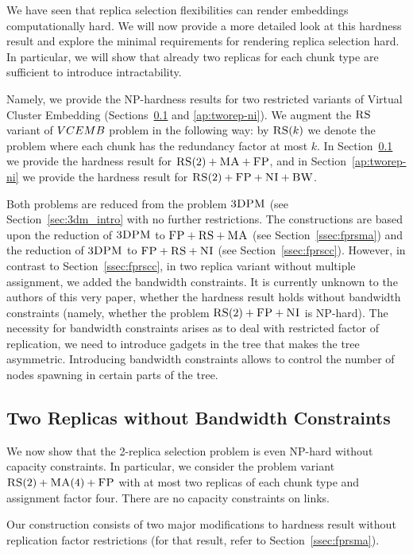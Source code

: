 We have seen that replica selection flexibilities can render embeddings computationally hard.
We will now provide a more detailed look at this hardness result
and explore the minimal requirements for rendering replica selection hard.
In particular, we will show that already two replicas for each chunk type are sufficient to
introduce intractability.

Namely, we provide the NP-hardness results for two restricted variants of Virtual Cluster Embedding (Sections~\ref{ap:tworep-ma} and \ref{ap:tworep-ni}).
We augment the $\textsc{RS}$ variant of $VCEMB$ problem in the following way: by $\textsc{RS}(k)$ we denote the problem where each chunk has the redundancy factor at most $k$.
In Section~\ref{ap:tworep-ma} we provide the hardness result for $\textsc{RS}(2)+\textsc{MA}+\textsc{FP}$, and in Section~\ref{ap:tworep-ni} we provide the hardness result for $\textsc{RS}(2)+\textsc{FP}+\textsc{NI}+\textsc{BW}$.

Both problems are reduced from the problem $\textsc{3DPM}$ (see Section~\ref{sec:3dm_intro} with no further restrictions.
The constructions are based upon the reduction of $\textsc{3DPM}$ to $\textsc{FP}+\textsc{RS}+\textsc{MA}$ (see Section~\ref{ssec:fprsma}) and the reduction of $\textsc{3DPM}$ to $\textsc{FP}+\textsc{RS}+\textsc{NI}$ (see Section~\ref{ssec:fprscc}).
However, in contrast to Section~\ref{ssec:fprscc}, in two replica variant without multiple assignment, we added the bandwidth constraints.
It is currently unknown to the authors of this very paper, whether the hardness result holds without bandwidth constraints (namely, whether the problem $\textsc{RS}(2)+\textsc{FP}+\textsc{NI}$ is NP-hard).
The necessity for bandwidth constraints arises as to deal with restricted factor of replication, we need to introduce gadgets in the tree that makes the tree asymmetric.
Introducing bandwidth constraints allows to control the number of nodes spawning in certain parts of the tree.

\subsection{Two Replicas without Bandwidth Constraints}\label{ap:tworep-ma}

We now show that the 2-replica selection problem is even NP-hard
without capacity constraints.  In particular, we consider the problem
variant~$\textsc{RS}(2)+\textsc{MA}(4)+\textsc{FP}$ with at most two replicas of each chunk type and assignment factor
four. There are no capacity constraints on links.

Our construction consists of two major modifications to hardness result without replication factor restrictions (for that result, refer to Section~\ref{ssec:fprsma}).

